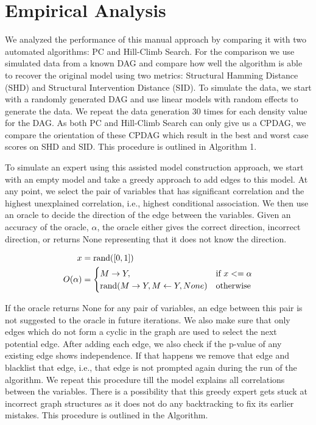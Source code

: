 \documentclass[letterpaper]{article} %
\begin{document}
\section{Empirical Analysis}

We analyzed the performance of this manual approach by comparing it with two
automated algorithms: PC and Hill-Climb Search. For the comparison we use
simulated data from a known DAG and compare how well the algorithm is able to
recover the original model using two metrics: Structural Hamming Distance (SHD)
and Structural Intervention Distance (SID). To simulate the data, we start with
a randomly generated DAG and use linear models with random effects to generate
the data. We repeat the data generation $ 30 $ times for each density value for
the DAG. As both PC and Hill-Climb Search can only give us a CPDAG, we compare
the orientation of these CPDAG which result in the best and worst case scores
on SHD and SID. This procedure is outlined in Algorithm 1.


To simulate an expert using this assisted model construction approach, we start
with an empty model and take a greedy approach to add edges to this model. At
any point, we select the pair of variables that has significant correlation and
the highest unexplained correlation, i.e., highest conditional association. We
then use an oracle to decide the direction of the edge between the variables.
Given an accuracy of the oracle, $ \alpha $, the oracle either gives the
correct direction, incorrect direction, or returns None representing that it
does not know the direction.

\begin{equation}
	\begin{split}
		x &= \textnormal{rand}([0, 1]) \\
		O(\alpha) &= \begin{cases} 
			M \rightarrow Y, & \textnormal{if  } x <= \alpha \\
			\textnormal{rand}(M \rightarrow Y, M \leftarrow Y, None) & \textnormal{otherwise} \\
				\end{cases} \\
	\end{split}
\end{equation}

If the oracle returns None for any pair of variables, an edge between this pair
is not suggested to the oracle in future iterations. We also make sure that
only edges which do not form a cyclic in the graph are used to select the next
potential edge. After adding each edge, we also check if the p-value of any
existing edge shows independence. If that happens we remove that edge and
blacklist that edge, i.e., that edge is not prompted again during the run of
the algorithm. We repeat this procedure till the model explains all
correlations between the variables. There is a possibility that this greedy
expert gets stuck at incorrect graph structures as it does not do any
backtracking to fix its earlier mistakes. This procedure is outlined in the
Algorithm.
\end{document}
